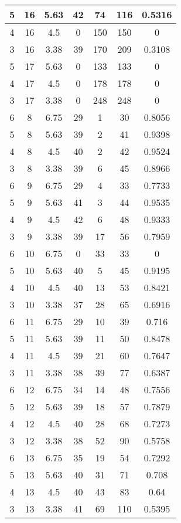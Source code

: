 \documentclass[letterpaper, 12pt]{article}
\begin{document}
\begin{longtable}{|c|c|c|c|c|c|c|}
\hline
5 & 16 & 5.63 & 42 & 74 & 116 & 0.5316 \\
\hline
4 & 16 & 4.5 & 0 & 150 & 150 & 0 \\
\hline
3 & 16 & 3.38 & 39 & 170 & 209 & 0.3108 \\
\hline
5 & 17 & 5.63 & 0 & 133 & 133 & 0 \\
\hline
4 & 17 & 4.5 & 0 & 178 & 178 & 0 \\
\hline
3 & 17 & 3.38 & 0 & 248 & 248 & 0 \\
\hline
6 & 8 & 6.75 & 29 & 1 & 30 & 0.8056 \\
\hline
5 & 8 & 5.63 & 39 & 2 & 41 & 0.9398 \\
\hline
4 & 8 & 4.5 & 40 & 2 & 42 & 0.9524 \\
\hline
3 & 8 & 3.38 & 39 & 6 & 45 & 0.8966 \\
\hline
6 & 9 & 6.75 & 29 & 4 & 33 & 0.7733 \\
\hline
5 & 9 & 5.63 & 41 & 3 & 44 & 0.9535 \\
\hline
4 & 9 & 4.5 & 42 & 6 & 48 & 0.9333 \\
\hline
3 & 9 & 3.38 & 39 & 17 & 56 & 0.7959 \\
\hline
6 & 10 & 6.75 & 0 & 33 & 33 & 0 \\
\hline
5 & 10 & 5.63 & 40 & 5 & 45 & 0.9195 \\
\hline
4 & 10 & 4.5 & 40 & 13 & 53 & 0.8421 \\
\hline
3 & 10 & 3.38 & 37 & 28 & 65 & 0.6916 \\
\hline
6 & 11 & 6.75 & 29 & 10 & 39 & 0.716 \\
\hline
5 & 11 & 5.63 & 39 & 11 & 50 & 0.8478 \\
\hline
4 & 11 & 4.5 & 39 & 21 & 60 & 0.7647 \\
\hline
3 & 11 & 3.38 & 38 & 39 & 77 & 0.6387 \\
\hline
6 & 12 & 6.75 & 34 & 14 & 48 & 0.7556 \\
\hline
5 & 12 & 5.63 & 39 & 18 & 57 & 0.7879 \\
\hline
4 & 12 & 4.5 & 40 & 28 & 68 & 0.7273 \\
\hline
3 & 12 & 3.38 & 38 & 52 & 90 & 0.5758 \\
\hline
6 & 13 & 6.75 & 35 & 19 & 54 & 0.7292 \\
\hline
5 & 13 & 5.63 & 40 & 31 & 71 & 0.708 \\
\hline
4 & 13 & 4.5 & 40 & 43 & 83 & 0.64 \\
\hline
3 & 13 & 3.38 & 41 & 69 & 110 & 0.5395 \\
\hline

\end{longtable}
\end{document}
